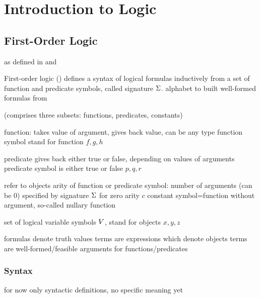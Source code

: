 \chapter{Introduction to Logic}
    \label{sec:introduction-logic}

    \section{First-Order Logic}
        \label{sec:first-order-logic}

        as defined in \cite{Platzer10HybridSystems} and \cite{Huth04LogicInCS}


        First-order logic (\FOL) defines a syntax of logical formulas inductively from a set of function and predicate symbols, called signature $\Sigma$. alphabet to built well-formed formulas from

        (comprises three subsets: functions, predicates, constants)

        function: takes value of argument, gives back value, can be any type
        function symbol stand for function
        $f,g,h$

        predicate gives back either true or false, depending on values of arguments
        predicate symbol is either true or false
        $p,q,r$

        refer to objects
        arity of function or predicate symbol: number of arguments (can be 0)
        specified by signature $\Sigma$
        for zero arity $c$ constant symbol=function without argument, so-called nullary function

        set of logical variable symbols $V$, stand for objects
        $x,y,z$

        formulas denote truth values
        terms are expressions which denote objects
        terms are well-formed/feasible arguments for functions/predicates

        \subsection{Syntax}
            \label{sec:FOL-syntax}

            for now only syntactic definitions, no specific meaning yet

